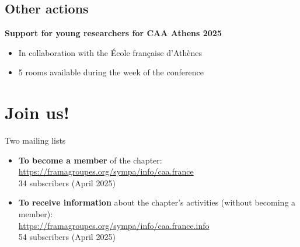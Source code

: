 \documentclass[xcolor=dvipsnames, 10pt, french, american]{beamer}
\begin{document}
\subsection{Other actions}
\frame{\tableofcontents[sectionstyle=show/shaded, subsectionstyle=show/shaded/hide]}
 
 
\begin{frame}
    \begin{block}{\textbf{Support for young researchers for CAA Athens 2025}}
       
        \begin{itemize}
            \item In collaboration with the École française d'Athènes
            \item 5 rooms available during the week of the conference 
        \end{itemize}
    \end{block}
\end{frame}



\section{Join us!}
\frame{\tableofcontents[sectionstyle=show/shaded, subsectionstyle=show/hide/hide]}
 
 
\begin{frame}
	\begin{block}{Two mailing lists}
		\begin{itemize}
			\item \textbf{To become a member} of the chapter: \\
                \url{https://framagroupes.org/sympa/info/caa.france}\\
                 34 subscribers (April 2025)
			\item \textbf{To receive information} about the chapter's activities (without becoming a member):\\ 
                \url{https://framagroupes.org/sympa/info/caa.france.info}\\
                  54 subscribers (April 2025)
		\end{itemize}
	\end{block}
\end{frame}
\end{document}
